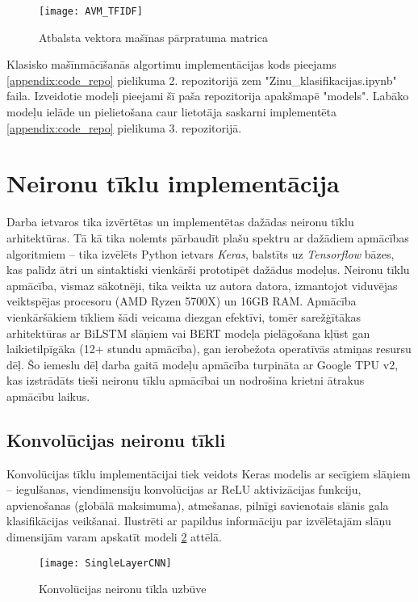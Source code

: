 \begin{figure}[H]
	\centering
	\texttt{[image: AVM\_TFIDF]}
	\caption{Atbalsta vektora mašīnas pārpratuma matrica}
	\label{fig:AVM_TFIDF}
\end{figure}

Klasisko mašīnmācīšanās algortimu implementācijas kods pieejams \ref{appendix:code_repo} pielikuma 2. repozitorijā zem "Zinu\_klasifikacijas.ipynb" faila. Izveidotie modeļi pieejami šī paša repozitorija apakšmapē "models". Labāko modeļu ielāde un pielietošana caur lietotāja saskarni implementēta \ref{appendix:code_repo} pielikuma 3. repozitorijā.

\pagebreak
\section{Neironu tīklu implementācija}

Darba ietvaros tika izvērtētas un implementētas dažādas neironu tīklu arhitektūras. Tā kā tika nolemts pārbaudīt plašu spektru ar dažādiem apmācības algoritmiem – tika izvēlēts Python ietvars \textit{Keras}, balstīts uz \textit{Tensorflow} bāzes, kas palīdz ātri un sintaktiski vienkārši prototipēt dažādus modeļus. Neironu tīklu apmācība, vismaz sākotnēji, tika veikta uz autora datora, izmantojot viduvējas veiktspējas procesoru (AMD Ryzen 5700X) un 16GB RAM. Apmācība vienkāršākiem tīkliem šādi veicama diezgan efektīvi, tomēr sarežģītākas arhitektūras ar BiLSTM slāņiem vai BERT modeļa pielāgošana kļūst gan laikietilpīgāka (12+ stundu apmācība), gan ierobežota operatīvās atmiņas resursu dēļ. Šo iemeslu dēļ darba gaitā modeļu apmācība turpināta ar Google TPU v2, kas izstrādāts tieši neironu tīklu apmācībai un nodrošina krietni ātrakus apmācību laikus.

\subsection{Konvolūcijas neironu tīkli}
Konvolūcijas tīklu implementācijai tiek veidots Keras modelis ar secīgiem slāņiem – iegulšanas, viendimensiju konvolūcijas ar ReLU aktivizācijas funkciju, apvienošanas (globālā maksimuma), atmešanas, pilnīgi savienotais slānis gala klasifikācijas veikšanai. Ilustrēti ar papildus informāciju par izvēlētajām slāņu dimensijām varam apskatīt modeli \ref{fig:SingleLayerCNN} attēlā.

\begin{figure}[H]
	\centering
	\texttt{[image: SingleLayerCNN]}
	\caption{Konvolūcijas neironu tīkla uzbūve}
	\label{fig:SingleLayerCNN}
\end{figure}


